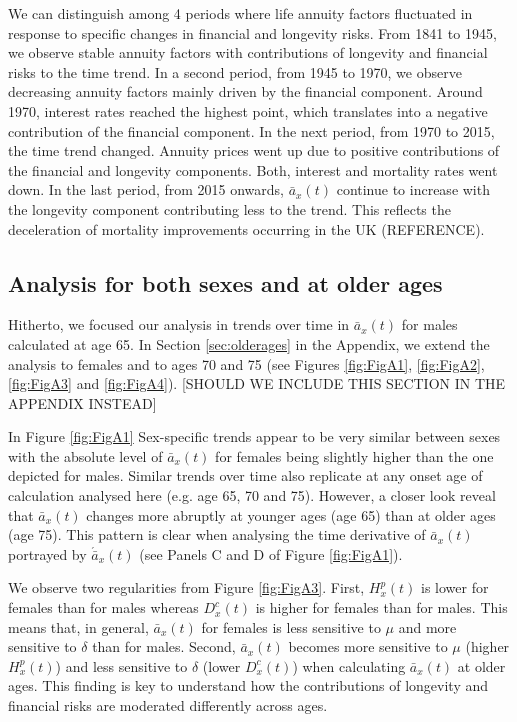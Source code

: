 \documentclass[12pt]{article}
\begin{document}
We can distinguish among 4 periods where life annuity factors fluctuated in response to specific changes in financial and longevity risks. From 1841 to 1945, we observe stable annuity factors with contributions of longevity and financial risks to the time trend. In a second period, from 1945 to 1970, we observe decreasing annuity factors mainly driven by the financial component. Around 1970, interest rates reached the highest point, which translates into a negative contribution of the financial component. In the next period, from 1970 to 2015, the time trend changed. Annuity prices went up due to positive contributions of the financial and longevity components. Both, interest and mortality rates went down. In the last period, from 2015 onwards, $\bar{a}_x(t)$ continue to increase with the longevity component contributing less to the trend. This reflects the deceleration of mortality improvements occurring in the UK (REFERENCE).
 
 
 \subsection{Analysis for both sexes and at older ages}
 
 Hitherto, we focused our analysis in trends over time in $\bar{a}_x(t)$ for males calculated at age 65. In Section \ref{sec:olderages} in the Appendix, we extend the analysis to females and to ages 70 and 75 (see Figures \ref{fig:FigA1}, \ref{fig:FigA2}, \ref{fig:FigA3} and \ref{fig:FigA4}). [SHOULD WE INCLUDE THIS SECTION IN THE APPENDIX INSTEAD]
 
  In Figure \ref{fig:FigA1} Sex-specific trends appear to be very similar between sexes with the absolute level of $\bar{a}_x(t)$ for females being slightly higher than the one depicted for males. Similar trends over time also replicate at any onset age of calculation analysed here (e.g. age 65, 70 and 75). However, a closer look reveal that $\bar{a}_x(t)$ changes more abruptly at younger ages (age 65) than at older ages (age 75). This pattern is clear when analysing the time derivative of $\bar{a}_x(t)$ portrayed by $\acute{\bar{a}}_x(t)$  (see Panels C and D of Figure \ref{fig:FigA1}).
  
  
  We observe two regularities from Figure \ref{fig:FigA3}. First, ${H}^{p}_x(t)$ is lower for females than for males whereas ${D}^{c}_x(t)$ is higher for females than for males. This means that, in general, $\bar{a}_x(t)$ for females is less sensitive to $\mu$ and more sensitive to $\delta$ than for males. Second, $\bar{a}_x(t)$ becomes more sensitive to $\mu$ (higher ${H}^{p}_x(t)$) and less sensitive to $\delta$ (lower ${D}^{c}_x(t)$) when calculating $\bar{a}_x(t)$ at older ages. This finding is key to understand how the contributions of longevity and financial risks are moderated differently across ages.
 
\end{document}
